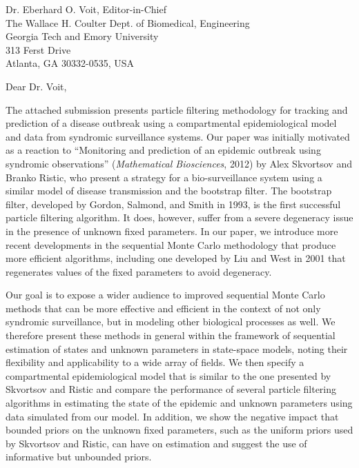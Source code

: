 \documentclass{letter} %
\begin{document}
\signature{Daniel M. Sheinson, Jarad Niemi, and Wendy Meiring}           %
\longindentation=0pt                       %
\let\raggedleft\raggedright                %

\begin{letter}{Dr. Eberhard O. Voit, Editor-in-Chief \\
The Wallace H. Coulter Dept. of Biomedical, Engineering \\
Georgia Tech and Emory University \\
313 Ferst Drive \\
Atlanta, GA 30332-0535, USA
}

\opening{Dear Dr. Voit,}

\noindent The attached submission presents particle filtering methodology for tracking and prediction of a disease outbreak using a compartmental epidemiological model and data from syndromic surveillance systems. Our paper was initially motivated as a reaction to ``Monitoring and prediction of an epidemic outbreak using syndromic observations'' (\emph{Mathematical Biosciences}, 2012) by Alex Skvortsov and Branko Ristic, who present a strategy for a bio-surveillance system using a similar model of disease transmission and the bootstrap filter. The bootstrap filter, developed by Gordon, Salmond, and Smith in 1993, is the first successful particle filtering algorithm. It does, however, suffer from a severe degeneracy issue in the presence of unknown fixed parameters. In our paper, we introduce more recent developments in the sequential Monte Carlo methodology that produce more efficient algorithms, including one developed by Liu and West in 2001 that regenerates values of the fixed parameters to avoid degeneracy.

Our goal is to expose a wider audience to improved sequential Monte Carlo methods that can be more effective and efficient in the context of not only syndromic surveillance, but in modeling other biological processes as well. We therefore present these methods in general within the framework of sequential estimation of states and unknown parameters in state-space models, noting their flexibility and applicability to a wide array of fields. We then specify a compartmental epidemiological model that is similar to the one presented by Skvortsov and Ristic and compare the performance of several particle filtering algorithms in estimating the state of the epidemic and unknown parameters using data simulated from our model. In addition, we show the negative impact that bounded priors on the unknown fixed parameters, such as the uniform priors used by Skvortsov and Ristic, can have on estimation and suggest the use of informative but unbounded priors.


\end{letter}
\end{document}
